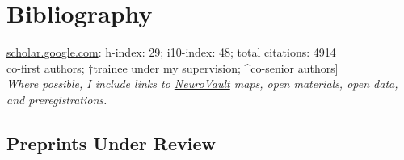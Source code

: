 \documentclass[11pt, letterpaper]{article}
\begin{document}
\pagebreak

\section*{Bibliography}
\aiGoogleScholar \hspace{.01cm} \href{https://scholar.google.com/citations?user=czV7OcQAAAAJ&hl=en}{scholar.google.com}: h-index: 29; i10-index: 48; total citations: 4914 \\ 
\lbrack*co-first authors; †trainee under my supervision; \^{}co-senior authors] \\ 

\textit{Where possible, I include links to \href{https://neurovault.org}{NeuroVault} maps, open materials, open data, and preregistrations.}




\subsection*{Preprints Under Review}
\end{document}
